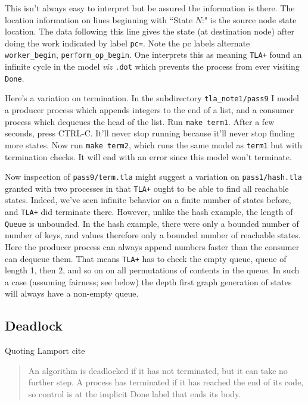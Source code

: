 \documentclass[twocolumn]{article}
\begin{document}
This isn't always easy to interpret but be assured the information is there. The location information on lines beginning with ``State $N$:" is the source node state location. The data following this line gives the state (at destination node) after doing the work indicated by label \texttt{pc=}. Note the pc labels alternate \texttt{worker\_begin}, \texttt{perform\_op\_begin}. One interprets this as meaning \texttt{TLA+} found an infinite cycle in the model \emph{viz} \texttt{.dot} which prevents the process from ever visiting \texttt{Done}.

Here's a variation on termination. In the subdirectory \texttt{tla\_note1/pass9} I model a producer process which appends integers to the end of a list, and a consumer process which dequeues the head of the list. Run \texttt{make term1}. After a few seconds, press CTRL-C. It'll never stop running because it'll never stop finding more states. Now run \texttt{make term2}, which runs the same model as \texttt{term1} but with termination checks. It will end with an error since this model won't terminate. 

Now inspection of \texttt{pass9/term.tla} might suggest a variation on \texttt{pass1/hash.tla} granted with two processes in that \texttt{TLA+} ought to be able to find all reachable states. Indeed, we've seen infinite behavior on a finite number of states before, and \texttt{TLA+} did terminate there. However, unlike the hash example, the length of \texttt{Queue} is unbounded. In the hash example, there were only a bounded number of number of keys, and values therefore only a bounded number of reachable states. Here the producer process can always append numbers faster than the consumer can dequeue them. That means \texttt{TLA+} has to check the empty queue, queue of length 1, then 2, and so on on all permutations of contents in the queue. In such a case (assuming fairness; see below) the depth first graph generation of states will always have a non-empty queue.

\subsection{Deadlock}
Quoting Lamport cite

\begin{quote} An algorithm is deadlocked if it has not terminated, but it can take no further step. A process has terminated if it has reached the end of its code, so control is at the implicit Done label that ends its body.
\end{quote}
\end{document}
